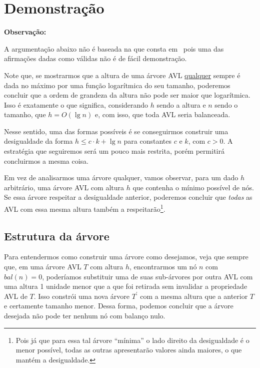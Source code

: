 \documentclass[10pt,a4paper,twoside]{article}
\theoremstyle{definition}
\begin{document}
    \section{Demonstração}

     \begin{framed}
       {\bfseries Observação:}

       A argumentação abaixo não é baseada na que consta em~\textcite{Szwarcfiter2010} pois uma das afirmações dadas como válidas não é de fácil demonstração.
     \end{framed}

     Note que, se mostrarmos que a altura de uma árvore AVL \ul{qualquer} sempre é dada no máximo por uma função logarítmica do seu tamanho, poderemos concluir que a ordem de grandeza da altura não pode ser maior que logarítmica. Isso é exatamente o que significa, considerando \( h \) sendo a altura e \( n \) sendo o tamanho, que \( h = O(\lg n) \) e, com isso, que toda AVL seria balanceada.

     Nesse sentido, uma das formas possíveis é se conseguirmos construir uma desigualdade da forma \( h \leq c \cdot k + \lg n \) para constantes \( c \) e \( k \), com \( c > 0 \). A estratégia que seguiremos será um pouco mais restrita, porém permitirá concluirmos a mesma coisa.

     Em vez de analisarmos uma árvore qualquer, vamos observar, para um dado \( h \) arbitrário, uma árvore AVL com altura \( h \) que contenha o mínimo possível de nós. Se essa árvore respeitar a desigualdade anterior, poderemos concluir que \emph{todas} as AVL com essa mesma altura também a respeitarão\footnote{Pois já que para essa tal árvore ``mínima'' o lado direito da desigualdade é o menor possível, todas as outras apresentarão valores ainda maiores, o que mantém a desigualdade.}.

    \subsection{Estrutura da árvore}

      Para entendermos como construir uma árvore como desejamos, veja que sempre que, em uma árvore AVL \( T \) com altura \( h \), encontrarmos um nó \( n \) com \( bal(n) = 0 \), poderíamos substituir uma de suas sub-árvores por outra AVL com uma altura 1 unidade menor que a que foi retirada sem invalidar a propriedade AVL de \( T \). Isso constrói uma nova árvore \( T^\prime \) com a mesma altura que a anterior \( T \) e certamente tamanho menor. Dessa forma, podemos concluir que a árvore desejada não pode ter nenhum nó com balanço nulo.
\end{document}
